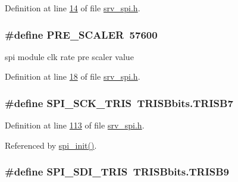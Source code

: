 Definition at line \hyperlink{a00011_source_l00014}{14} of file \hyperlink{a00011_source}{srv\+\_\+spi.\+h}.

\hypertarget{a00011_a5c1fd7fa207a92f0b4b78d39bbd2f34b}{
\subsubsection[{P\+R\+E\+\_\+\+S\+C\+A\+L\+E\+R}]{\setlength{\rightskip}{0pt plus 5cm}\#define P\+R\+E\+\_\+\+S\+C\+A\+L\+E\+R~57600}}\label{a00011_a5c1fd7fa207a92f0b4b78d39bbd2f34b}


spi module clk rate pre scaler value 



Definition at line \hyperlink{a00011_source_l00018}{18} of file \hyperlink{a00011_source}{srv\+\_\+spi.\+h}.

\hypertarget{a00011_a98c4bd0ee0f76eb205e874355bf9cd33}{
\subsubsection[{S\+P\+I\+\_\+\+S\+C\+K\+\_\+\+T\+R\+I\+S}]{\setlength{\rightskip}{0pt plus 5cm}\#define S\+P\+I\+\_\+\+S\+C\+K\+\_\+\+T\+R\+I\+S~T\+R\+I\+S\+Bbits.\+T\+R\+I\+S\+B7}}\label{a00011_a98c4bd0ee0f76eb205e874355bf9cd33}


Definition at line \hyperlink{a00011_source_l00113}{113} of file \hyperlink{a00011_source}{srv\+\_\+spi.\+h}.



Referenced by \hyperlink{a00030_source_l00030}{spi\+\_\+init()}.

\hypertarget{a00011_a40c85fd42ffb12b326b7cb9ee48f2ffb}{
\subsubsection[{S\+P\+I\+\_\+\+S\+D\+I\+\_\+\+T\+R\+I\+S}]{\setlength{\rightskip}{0pt plus 5cm}\#define S\+P\+I\+\_\+\+S\+D\+I\+\_\+\+T\+R\+I\+S~T\+R\+I\+S\+Bbits.\+T\+R\+I\+S\+B9}}\label{a00011_a40c85fd42ffb12b326b7cb9ee48f2ffb}


